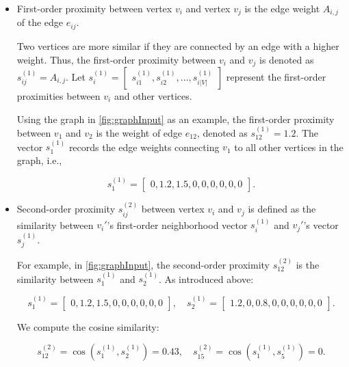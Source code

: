 \begin{itemize}
	\item
	\begin{definition}\label{def:firstOrderProximity}
		First-order proximity between vertex \(v_i\) and vertex \(v_j\) is the edge weight \(A_{i, j}\) of the edge \(e_{ij}\).
	\end{definition}
	
	Two vertices are more similar if they are connected by an edge with a higher weight. Thus, the first-order proximity between \(v_i\) and \(v_j\) is denoted as \(s^{(1)}_{ij} = A_{i, j}\). Let \(s^{(1)}_i = \begin{bmatrix} s^{(1)}_{i1}, s^{(1)}_{i2}, \dots, s^{(1)}_{i|V|} \end{bmatrix}\) represent the first-order proximities between \(v_i\) and other vertices.
	
	Using the graph in \autoref{fig:graphInput} as an example, the first-order proximity between \(v_1\) and \(v_2\) is the weight of edge \(e_{12}\), denoted as \(s^{(1)}_{12} = 1.2\). The vector \(s^{(1)}_1\) records the edge weights connecting \(v_1\) to all other vertices in the graph, i.e.,
	
	\[
	s^{(1)}_{1} = \begin{bmatrix} 0, 1.2, 1.5, 0, 0, 0, 0, 0, 0 \end{bmatrix}.
	\]
	
	\item
	\begin{definition}\label{def:secondOrderProximity}
		Second-order proximity \(s^{(2)}_{ij}\) between vertex \(v_i\) and \(v_j\) is defined as the similarity between \(v_i'\)'s first-order neighborhood vector \(s^{(1)}_i\) and \(v_j'\)'s vector \(s^{(1)}_j\).
	\end{definition}
	
	For example, in \autoref{fig:graphInput}, the second-order proximity \(s^{(2)}_{12}\) is the similarity between \(s^{(1)}_1\) and \(s^{(1)}_2\). As introduced above:
	
	\[
	s^{(1)}_1 = \begin{bmatrix} 0, 1.2, 1.5, 0, 0, 0, 0, 0, 0 \end{bmatrix}, \quad s^{(1)}_2 = \begin{bmatrix} 1.2, 0, 0.8, 0, 0, 0, 0 , 0, 0 \end{bmatrix}.
	\]
	
	We compute the cosine similarity:
	
	\[
	s^{(2)}_{12} = \cos(s^{(1)}_1, s^{(1)}_2) = 0.43, \quad s^{(2)}_{15} = \cos(s^{(1)}_1, s^{(1)}_5) = 0.
	\]
	

\end{itemize}
